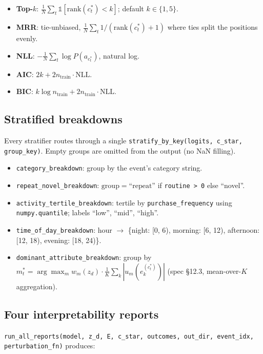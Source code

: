 \documentclass[11pt,a4paper]{article}
\begin{document}
\begin{itemize}
\item \textbf{Top-$k$}: $\frac{1}{N} \sum_t \mathbb{1}[\text{rank}(c^*_t) < k]$; default $k \in \{1, 5\}$.
\item \textbf{MRR}: tie-unbiased, $\frac{1}{N} \sum_t 1/(\text{rank}(c^*_t) + 1)$ where ties split the positions evenly.
\item \textbf{NLL}: $-\frac{1}{N} \sum_t \log P(a_{c^*_t})$, natural log.
\item \textbf{AIC}: $2k + 2 n_{\text{train}} \cdot \text{NLL}$.
\item \textbf{BIC}: $k \log n_{\text{train}} + 2 n_{\text{train}} \cdot \text{NLL}$.
\end{itemize}

\subsection{Stratified breakdowns}

Every stratifier routes through a single
\texttt{stratify\_by\_key(logits, c\_star, group\_key)}. Empty groups
are omitted from the output (no NaN filling).

\begin{itemize}
\item \texttt{category\_breakdown}: group by the event's category string.
\item \texttt{repeat\_novel\_breakdown}: $\mathrm{group} = \text{``repeat''}$ if \texttt{routine > 0} else ``novel''.
\item \texttt{activity\_tertile\_breakdown}: tertile by
\texttt{purchase\_frequency} using \texttt{numpy.quantile}; labels
``low'', ``mid'', ``high''.
\item \texttt{time\_of\_day\_breakdown}: hour $\to$
\{night: [0, 6), morning: [6, 12), afternoon: [12, 18),
evening: [18, 24)\}.
\item \texttt{dominant\_attribute\_breakdown}: group by
$m^*_t = \arg\max_m w_m(z_d) \cdot \frac{1}{K}\sum_k |u_m(e_k^{(c^*_t)})|$ (spec \S 12.3, mean-over-$K$ aggregation).
\end{itemize}

\subsection{Four interpretability reports}

\texttt{run\_all\_reports(model, z\_d, E, c\_star, outcomes, out\_dir,
event\_idx, perturbation\_fn)} produces:
\end{document}

